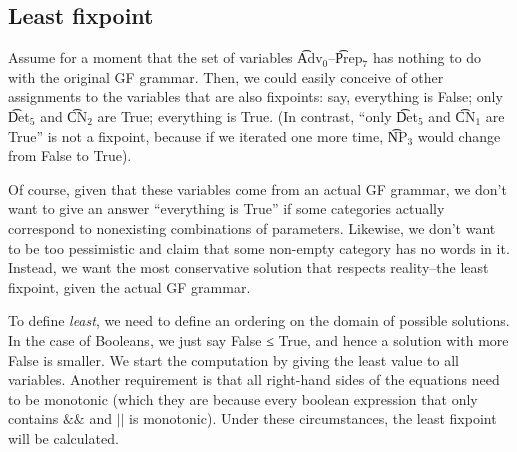 \begin{EmptyItem}
\begin{Highlighting}[]
  \OtherTok{::=} \FunctionTok{&&} \FunctionTok{||} \FunctionTok{&&}  \NormalTok{;}
  \OtherTok{::=} \FunctionTok{&&} \FunctionTok{||}  \NormalTok{;}
  \OtherTok{::=} \FunctionTok{&&}  \NormalTok{;}
  \OtherTok{::=} \FunctionTok{&&}  \NormalTok{;}
  \OtherTok{::=} \FunctionTok{&&}  \NormalTok{;}
  \OtherTok{::=}  \NormalTok{;}
  \OtherTok{::=}  \NormalTok{;}
  \OtherTok{::=}  \NormalTok{;}
\end{Highlighting}
\end{EmptyItem}

\subsection{Least fixpoint}


Assume for a moment that the set of variables  \t{Adv$_\text{0}$}--\t{Prep$_\text{7}$} has nothing to do with the original GF grammar. Then, we could easily conceive of other assignments to the variables that are also fixpoints: say, everything is False; only \t{Det$_\text{5}$} and \t{CN$_\text{2}$} are True; everything is True. (In contrast, “only \t{Det$_\text{5}$} and \t{CN$_\text{1}$} are True” is not a fixpoint, because if we iterated one more time, \t{NP$_\text{3}$} would change from False to True).

Of course, given that these variables come from an actual GF grammar, we don’t want to give an answer “everything is True” if some categories actually correspond to nonexisting combinations of parameters. Likewise, we don’t want to be too pessimistic and claim that some non-empty category has no words in it. Instead, we want the most conservative solution that respects reality--the least fixpoint, given the actual GF grammar.

To define \emph{least}, we need to define an ordering on the domain of possible solutions. In the case of Booleans, we just say False ≤ True, and hence a solution with more False is smaller. 
We start the computation by giving the least value to all variables.
Another requirement is that all right-hand sides of the equations need to be monotonic (which they are because every boolean expression that only contains $\&\&$ and $||$ is monotonic). Under these circumstances, the least fixpoint will be calculated.

